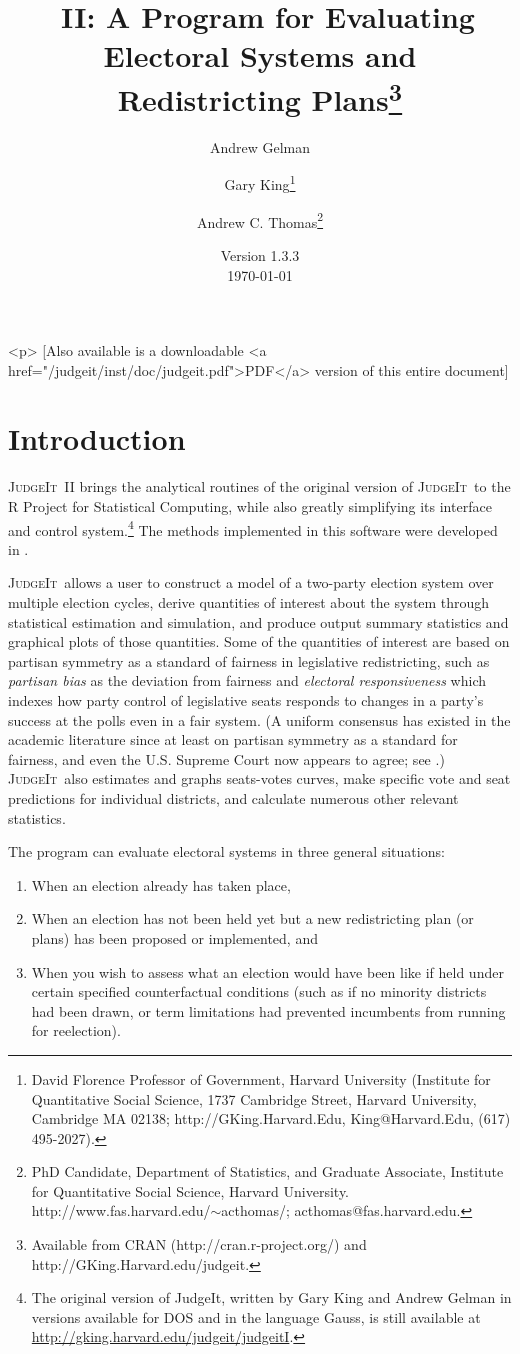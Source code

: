 \documentclass[oneside,letterpaper,titlepage]{article}
\title{\JudgeIt~II: A Program for Evaluating Electoral Systems and
  Redistricting Plans\thanks{Available from CRAN (http://cran.r-project.org/) and
    http://GKing.Harvard.edu/judgeit.}}
\author{Andrew Gelman \and Gary King\thanks{David Florence Professor
    of Government, Harvard University (Institute for Quantitative
    Social Science, 1737 Cambridge Street, Harvard University,
    Cambridge MA 02138; http://GKing.Harvard.Edu, King@Harvard.Edu,
    (617) 495-2027).}  \and %
	Andrew C. Thomas\thanks{PhD Candidate, Department of Statistics, and Graduate Associate, Institute for Quantitative Social Science, Harvard University. http://www.fas.harvard.edu/$\sim$acthomas/; acthomas@fas.harvard.edu.}}
\date{Version 1.3.3\\ \today}
\newcommand{\JudgeIt}{\textsc{JudgeIt}\ }
\begin{document}
\maketitle

\begin{rawhtml}
  <p> [Also available is a downloadable <a
  href="/judgeit/inst/doc/judgeit.pdf">PDF</a> version of this entire document]
\end{rawhtml}

\tableofcontents
\clearpage

\section{Introduction}

\JudgeIt II brings the analytical routines of the original version of \JudgeIt to the R Project for Statistical Computing, while also greatly simplifying its interface and control system.\footnote{The original version of JudgeIt, written by Gary King and Andrew Gelman in   versions available for DOS and in the language Gauss, is still available at \url{http://gking.harvard.edu/judgeit/judgeitI}.}  The methods implemented in this software were developed in \citet{GelKin90,GelKin90b,GelKin94a,GelKin94b,KinGel91,GelKatKin04}.

\JudgeIt allows a user to construct a model of a two-party election system over multiple election cycles, derive quantities of interest about the system through statistical estimation and simulation, and produce output summary statistics and graphical plots of those quantities.  Some of the quantities of interest are based on partisan symmetry as a standard of fairness in legislative redistricting, such as \emph{partisan bias} as the deviation from fairness and \emph{electoral responsiveness} which indexes how party control of legislative seats responds to changes in a party's success at the polls even in a fair system.  (A uniform consensus has existed in the academic literature since at least \citet{KinBro87} on partisan symmetry as a standard for fairness, and even the U.S. Supreme Court now appears to agree; see \citealt{GroKin07}.)  \JudgeIt also estimates and graphs seats-votes curves, make specific vote and seat predictions for individual districts, and calculate numerous other relevant statistics.

The program can evaluate electoral systems in three general situations:
\begin{enumerate}
\item When an election already has taken place,
\item When an election has not been held yet but a new redistricting plan (or plans) has been proposed or implemented, and
\item When you wish to assess what an election would have been like if held under certain specified counterfactual conditions (such as if no minority districts had been drawn, or term limitations had prevented incumbents from running for reelection).
\end{enumerate}
\end{document}
